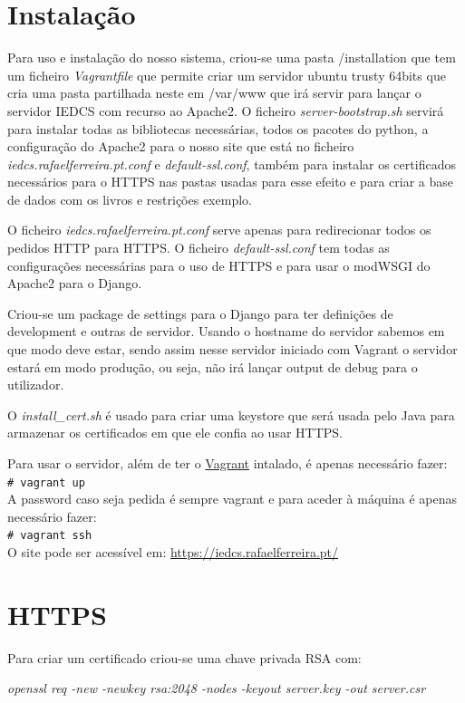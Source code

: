\documentclass[pdftex,12pt,a4paper]{report}
\newcommand{\shellcmd}[1]{\\\indent\indent\texttt{\footnotesize\# #1}\\}
\begin{document}
\section{Instalação}

Para uso e instalação do nosso sistema, criou-se uma pasta /installation que tem um ficheiro \textit{Vagrantfile} que permite criar um servidor ubuntu trusty 64bits que cria uma pasta partilhada neste em /var/www que irá servir para lançar o servidor IEDCS com recurso ao Apache2. O ficheiro \textit{server-bootstrap.sh} servirá para instalar todas as bibliotecas necessárias, todos os pacotes do python, a configuração do Apache2 para o nosso site que está no ficheiro \textit{iedcs.rafaelferreira.pt.conf} e \textit{default-ssl.conf}, também para instalar os certificados necessários para o HTTPS nas pastas usadas para esse efeito e para criar a base de dados com os livros e restrições exemplo.
	
O ficheiro \textit{iedcs.rafaelferreira.pt.conf} serve apenas para redirecionar todos os pedidos HTTP para HTTPS. O ficheiro \textit{default-ssl.conf} tem todas as configurações necessárias para o uso de HTTPS e para usar o modWSGI do Apache2 para o Django.

Criou-se um package de settings para o Django para ter definições de development e outras de servidor. Usando o hostname do servidor sabemos em que modo deve estar, sendo assim nesse servidor iniciado com Vagrant o servidor estará em modo produção, ou seja, não irá lançar output de debug para o utilizador.

O \textit{install{\_}cert.sh} é usado para criar uma keystore que será usada pelo Java para armazenar os certificados em que ele confia ao usar HTTPS.	
	
Para usar o servidor, além de ter o \href{https://www.vagrantup.com/downloads.html}{Vagrant} intalado, é apenas necessário fazer:
\shellcmd{vagrant up}

A password caso seja pedida é sempre vagrant e para aceder à máquina é apenas necessário fazer: \shellcmd{vagrant ssh}

O site pode ser acessível em: \url{https://iedcs.rafaelferreira.pt/}

\section{HTTPS}
Para criar um certificado criou-se uma chave privada RSA com:

\textit{openssl req -new -newkey rsa:2048 -nodes -keyout server.key -out server.csr}
\end{document}
